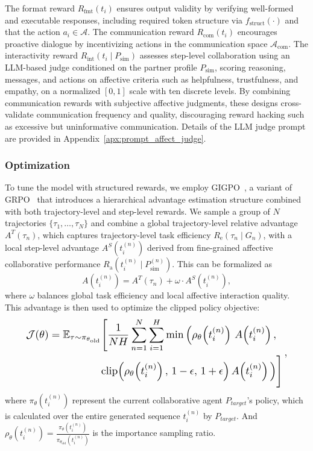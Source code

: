 \documentclass{article}
\theoremstyle{plain}
\theoremstyle{definition}
\theoremstyle{remark}
\begin{document}
The format reward $R_{\text{fmt}}(t_i)$ ensures output validity by verifying well-formed and executable responses, including required token structure via $f_{\text{struct}}(\cdot)$ and that the action $a_i \in \mathcal{A}$. The communication reward $R_{\text{com}}(t_i)$ encourages proactive dialogue by incentivizing actions in the communication space $\mathcal{A}_{\text{com}}$. The interactivity reward $R_{\text{int}}(t_i \mid P_{\text{sim}})$ assesses step-level collaboration using an LLM-based judge conditioned on the partner profile $P_{\text{sim}}$, scoring reasoning, messages, and actions on affective criteria such as helpfulness, trustfulness, and empathy, on a normalized $[0,1]$ scale with ten discrete levels. By combining communication rewards with subjective affective judgments, these designs cross-validate communication frequency and quality, discouraging reward hacking such as excessive but uninformative communication. Details of the LLM judge prompt are provided in Appendix~\ref{apx:prompt_affect_judge}.





\subsubsection{Optimization}

To tune the model with structured rewards, we employ GIGPO~\cite{feng2025group}, a variant of GRPO~\cite{guo2025deepseek} that introduces a hierarchical advantage estimation structure combined with both trajectory-level and step-level rewards. We sample a group of $N$ trajectories $\{\tau_1,\dots,\tau_N\}$ and combine a global trajectory-level relative advantage $A^T(\tau_n)$, which captures trajectory-level task efficiency $R_{\text{e}}(\tau_n \mid G_n)$, with a local step-level advantage $A^S(t^{(n)}_i)$ derived from fine-grained affective collaborative performance $R_{\text{a}}(t^{(n)}_i \mid P^{(n)}_{\text{sim}})$. This can be formalized as
\begin{equation}
    A(t^{(n)}_i) = A^T(\tau_n) + \omega \cdot A^S(t^{(n)}_i),
\end{equation}
where $\omega$ balances global task efficiency and local affective interaction quality. This advantage is then used to optimize the clipped policy objective:
\begin{equation}
\resizebox{.90\linewidth}{!}{$
        \displaystyle
\begin{aligned}
\mathcal{J}(\theta) =
\mathbb{E}_{\tau \sim \pi_{\theta_{\text{old}}}} &\Bigg[ \frac{1}{NH} \sum_{n=1}^{N} \sum_{i=1}^{H} 
\min \Big( 
 \rho_{\theta}\!\left(t_i^{(n)}\right)\, A\!\left(t_i^{(n)}\right), \\
& \mathrm{clip}\!\left(\rho_{\theta}\!\left(t_i^{(n)}\right),\, 1 - \epsilon,\, 1 + \epsilon \right)
A\!\left(t_i^{(n)}\right) 
\Big) \Bigg]
\end{aligned}\,,
$}
\end{equation}
where $\pi_{\theta}(t_i^{(n)})$ represent the current collaborative agent $P_{target}$'s policy, which is calculated over the entire generated sequence $t_i^{(n)}$ by $P_{target}$. And $\rho_\theta(t_i^{(n)}) = \frac{\pi_\theta(t_i^{(n)})}{\pi_{\theta_{\text{old}}}(t_i^{(n)})}$ is the importance sampling ratio. 
\end{document}
